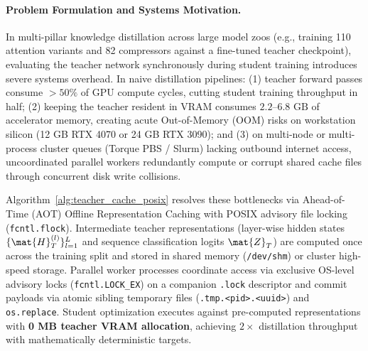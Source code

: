 \paragraph{Problem Formulation and Systems Motivation.}
In multi-pillar knowledge distillation across large model zoos (e.g., training 110 attention variants and 82 compressors against a fine-tuned teacher checkpoint), evaluating the teacher network synchronously during student training introduces severe systems overhead. In naive distillation pipelines: (1) teacher forward passes consume $>50\%$ of GPU compute cycles, cutting student training throughput in half; (2) keeping the teacher resident in VRAM consumes $2.2\text{--}6.8\text{ GB}$ of accelerator memory, creating acute Out-of-Memory (OOM) risks on workstation silicon (12 GB RTX 4070 or 24 GB RTX 3090); and (3) on multi-node or multi-process cluster queues (Torque PBS / Slurm) lacking outbound internet access, uncoordinated parallel workers redundantly compute or corrupt shared cache files through concurrent disk write collisions.

Algorithm~\ref{alg:teacher_cache_posix} resolves these bottlenecks via Ahead-of-Time (AOT) Offline Representation Caching with POSIX advisory file locking (\texttt{fcntl.flock}). Intermediate teacher representations (layer-wise hidden states $\{\mat{H}_T^{(l)}\}_{l=1}^L$ and sequence classification logits $\mat{Z}_T$) are computed once across the training split and stored in shared memory (\texttt{/dev/shm}) or cluster high-speed storage. Parallel worker processes coordinate access via exclusive OS-level advisory locks (\texttt{fcntl.LOCK\_EX}) on a companion \texttt{.lock} descriptor and commit payloads via atomic sibling temporary files (\texttt{.tmp.<pid>.<uuid>}) and \texttt{os.replace}. Student optimization executes against pre-computed representations with \textbf{0 MB teacher VRAM allocation}, achieving $2\times$ distillation throughput with mathematically deterministic targets.

